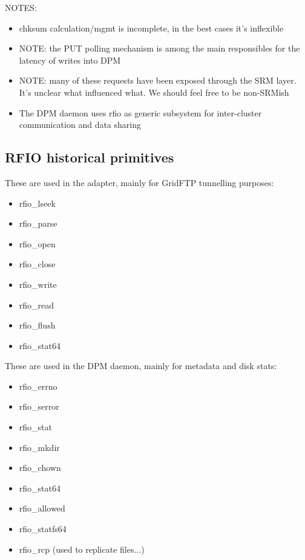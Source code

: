 \documentclass[a4paper,10pt]{scrreprt}
\begin{document}
NOTES:
\begin{itemize}
 \item chksum calculation/mgmt is incomplete, in the best cases it's inflexible
 \item NOTE: the PUT polling mechanism is among the main responsibles for the latency of writes into DPM
 \item NOTE: many of these requests have been exposed through the SRM layer. It's unclear what influenced what. We should feel free to be non-SRMish
 \item The DPM daemon uses rfio as generic subsystem for inter-cluster communication and data sharing
\end{itemize}



\subsection{RFIO historical primitives}

 These are used in the adapter, mainly for GridFTP tunnelling purposes:\\

\begin{itemize}
\item rfio\_lseek
\item rfio\_parse
\item rfio\_open
\item rfio\_close
\item rfio\_write
\item rfio\_read
\item rfio\_flush
\item rfio\_stat64
\end{itemize}


 These are used in the DPM daemon, mainly for metadata and disk stats:\\

\begin{itemize}
\item rfio\_errno
\item rfio\_serror
\item rfio\_stat
\item rfio\_mkdir
\item rfio\_chown
\item rfio\_stat64
\item rfio\_allowed
\item rfio\_statfs64
\item rfio\_rcp (used to replicate files...)
\end{itemize}
\end{document}
